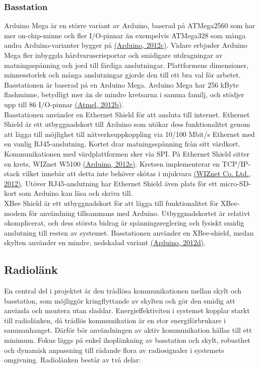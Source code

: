 \documentclass[a4paper,11pt]{article}
\begin{document}
\subsubsection{Basstation}
Arduino Mega är en större variant av Arduino, baserad på ATMega2560 som har mer on-chip-minne och fler I/O-pinnar än exempelvis ATMega328 som många andra Arduino-varianter bygger på \hyperref[arduino]{(Arduino, 2012c)}. Vidare erbjuder Arduino Mega fler inbyggda hårdvaruserieportar och smidigare utdragningar av matningsspänning och jord till färdiga anslutningar. Plattformens dimensioner, minnesstorlek och många anslutningar gjorde den till ett bra val för arbetet. Basstationen är baserad på en Arduino Mega. Arduino Mega har 256 kByte flashminne, betydligt mer än de mindre kretsarna i samma familj, och stödjer upp till 86 I/O-pinnar \hyperref[atmel]{(Atmel, 2012b)}. \\

Basstationen använder en Ethernet Shield för att ansluta till internet. Ethernet Shield är ett utbyggnadskort till Arduino som utökar dess funktionalitet genom att lägga till möjlighet till nätverksuppkoppling via 10/100 Mbit/s Ethernet med en vanlig RJ45-anslutning. Kortet drar matningsspänning från sitt värdkort. Kommunikationen med värdplattformen sker via SPI. På Ethernet Shield sitter en krets, WIZnet W5100 \hyperref[arduino]{(Arduino, 2012e)}. Kretsen implementerar en TCP/IP-stack vilket innebär att detta inte behöver skötas i mjukvara \hyperref[wiznet]{(WIZnet Co. Ltd., 2012)}. Utöver RJ45-anslutning har Ethernet Shield även plats för ett micro-SD-kort som Arduino kan läsa och skriva till. \\

XBee Shield är ett utbyggnadskort för att lägga till funktionalitet för XBee-modem för användning tillsammans med Arduino. Utbyggnadskortet är relativt okomplicerat, och dess största bidrag är spänningsreglering och fysiskt smidig anslutning till resten av systemet. Basstationen använder en XBee-shield, medan skylten använder en mindre, nedskalad variant \hyperref[arduino]{(Arduino, 2012d)}.

\subsection{Radiolänk}
En central del i projektet är den trådlösa kommunikationen mellan skylt och basstation, som möjliggör kringflyttande av skylten och gör den smidig att använda och montera utan sladdar. Energieffektiviten i systemet kopplar starkt till radiolänken, då trådlös kommunikation är en stor energiförbrukare i sammanhanget. Därför bör användningen av aktiv kommunikation hållas till ett minimum. Fokus läggs på enkel ihoplänkning av basstation och skylt, robusthet och dynamisk anpassning till rådande flora av radiosignaler i systemets omgivning. Radiolänken består av två delar:
	
\end{document}
